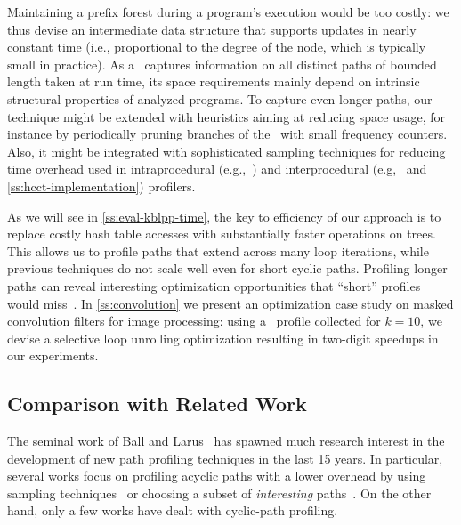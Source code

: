 Maintaining a prefix forest during a program's execution would be too costly: we thus devise an intermediate data structure that supports updates in nearly constant time (i.e., proportional to the degree of the node, which is typically small in practice). As a \ksf\ captures information on all distinct paths of bounded length taken at run time, its space requirements mainly depend on intrinsic structural properties of analyzed programs. To capture even longer paths, our technique might be extended with heuristics aiming at reducing space usage, for instance by periodically pruning branches of the \ksf\ with small frequency counters. Also, it might be integrated with sophisticated sampling techniques for reducing time overhead used in intraprocedural (e.g.,~\cite{Bond05}) and interprocedural (e.g,~\cite{Zhuang06} and \mysection\ref{ss:hcct-implementation}) profilers.

As we will see in \mysection\ref{ss:eval-kblpp-time}, the key to efficiency of our approach is to replace costly hash table accesses with substantially faster operations on trees. This allows us to profile paths that extend across many loop iterations, while previous techniques do not scale well even for short cyclic paths. Profiling longer paths can reveal interesting optimization opportunities that ``short'' profiles would miss~\cite{Delia13}. In \mysection\ref{ss:convolution} we present an optimization case study on masked convolution filters for image processing: using a \kipf\ profile collected for $k=10$, we devise a selective loop unrolling optimization resulting in two-digit speedups in our experiments.




\subsection{Comparison with Related Work}
\label{ss:kblpp-related}

The seminal work of Ball and Larus~\cite{Ball96} has spawned much research interest in the development of new path profiling techniques in the last 15 years. In particular, several works focus on profiling acyclic paths with a lower overhead by using sampling techniques~\cite{Bond05,Bond05b} or choosing a subset of {\em interesting} paths~\cite{Apiwattanapong02,Joshi04,Vaswani07}.
On the other hand, only a few works have dealt with cyclic-path profiling.

